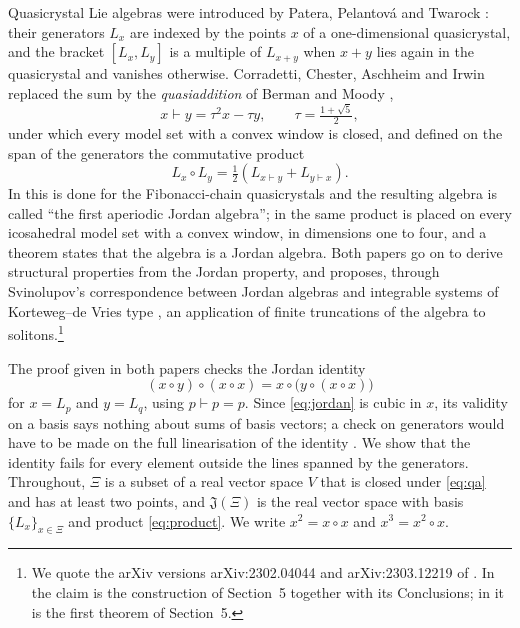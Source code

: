 \documentclass[11pt]{amsart}
\theoremstyle{definition}
\theoremstyle{remark}
\newcommand{\J}{\mathfrak{J}}
\newcommand{\qa}{\vdash}
\begin{document}
Quasicrystal Lie algebras were introduced by Patera, Pelantov\'a and Twarock \cite{PPT98}: their generators $L_x$ are indexed by the points $x$ of a one-dimensional quasicrystal, and the bracket $[L_x,L_y]$ is a multiple of $L_{x+y}$ when $x+y$ lies again in the quasicrystal and vanishes otherwise. Corradetti, Chester, Aschheim and Irwin replaced the sum by the \emph{quasiaddition} of Berman and Moody \cite{BM94},
\begin{equation}\label{eq:qa}
x\qa y=\tau^2x-\tau y,\qquad \tau=\tfrac{1+\sqrt5}{2},
\end{equation}
under which every model set with a convex window is closed, and defined on the span of the generators the commutative product
\begin{equation}\label{eq:product}
L_x\circ L_y=\tfrac12\left(L_{x\qa y}+L_{y\qa x}\right).
\end{equation}
In \cite[Section~5]{CCAI23} this is done for the Fibonacci-chain quasicrystals and the resulting algebra is called ``the first aperiodic Jordan algebra''; in \cite[Section~5]{CCAI25} the same product is placed on every icosahedral model set with a convex window, in dimensions one to four, and a theorem states that the algebra is a Jordan algebra. Both papers go on to derive structural properties from the Jordan property, and \cite{CCAI23} proposes, through Svinolupov's correspondence between Jordan algebras and integrable systems of Korteweg--de Vries type \cite{Svi91}, an application of finite truncations of the algebra to solitons.\footnote{We quote the arXiv versions arXiv:2302.04044 and arXiv:2303.12219 of \cite{CCAI23,CCAI25}. In \cite{CCAI23} the claim is the construction of Section~5 together with its Conclusions; in \cite{CCAI25} it is the first theorem of Section~5.}

The proof given in both papers checks the Jordan identity
\begin{equation}\label{eq:jordan}
(x\circ y)\circ(x\circ x)=x\circ\bigl(y\circ(x\circ x)\bigr)
\end{equation}
for $x=L_p$ and $y=L_q$, using $p\qa p=p$. Since \eqref{eq:jordan} is cubic in $x$, its validity on a basis says nothing about sums of basis vectors; a check on generators would have to be made on the full linearisation of the identity \cite[Part~II]{McC04}. We show that the identity fails for every element outside the lines spanned by the generators. Throughout, $\Xi$ is a subset of a real vector space $V$ that is closed under \eqref{eq:qa} and has at least two points, and $\J(\Xi)$ is the real vector space with basis $\{L_x\}_{x\in\Xi}$ and product \eqref{eq:product}. We write $x^2=x\circ x$ and $x^3=x^2\circ x$.
\end{document}
